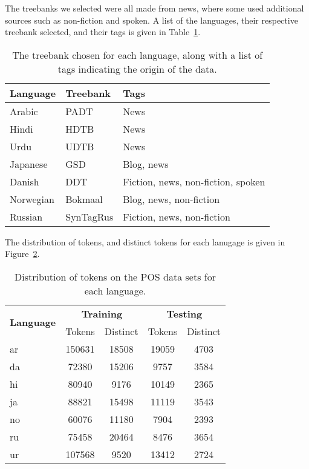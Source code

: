The treebanks we selected were all made from news, where some used additional
sources such as non-fiction and spoken. A list of the languages, their
respective treebank selected, and their tags is given in
Table~\ref{table:lang_treebank}.

\begin{table}[!ht]
  \centering
  \begin{tabular}{lll}
    \bfseries Language & \bfseries Treebank & \bfseries Tags \\
    \midrule
    Arabic & PADT & News \\
    Hindi &    HDTB & News \\
    Urdu &     UDTB & News \\
    Japanese & GSD & Blog, news \\
    Danish &   DDT & Fiction, news, non-fiction, spoken \\
    Norwegian & Bokmaal & Blog, news, non-fiction \\
    Russian &  SynTagRus & Fiction, news, non-fiction \\
  \end{tabular}
  \caption{The treebank chosen for each language, along with a list of tags
  indicating the origin of the data.}\label{table:lang_treebank}
\end{table}

The distribution of tokens, and distinct tokens for each lanugage is given in
Figure~\ref{table:token-distribution-pos}.

\begin{table}[h!]
    \centering
    \begin{tabular}{l c c c c}%
        \toprule
        \multirow{2}{*}{\bfseries Language} &
        \multicolumn{2}{c}{\bfseries Training} &
        \multicolumn{2}{c}{\bfseries Testing} \\
        \cmidrule(lr){2-5}
        & Tokens & Distinct & Tokens & Distinct \\
        
        \cmidrule(lr){1-5}

        ar   & 150631 & 18508 & 19059 & 4703 \\

        da   &  72380 & 15206 & 9757 & 3584 \\

        hi   &  80940 &  9176 & 10149 & 2365 \\

        ja   &  88821 & 15498 &11119 & 3543 \\

        no   &  60076 & 11180 & 7904 & 2393 \\

        ru   &  75458 & 20464 & 8476 &  3654 \\

        ur   & 107568 & 9520 & 13412 &  2724 \\

        \bottomrule
    \end{tabular}
    \caption{Distribution of tokens on the POS data sets for each language.
    }\label{table:token-distribution-pos}
\end{table}


